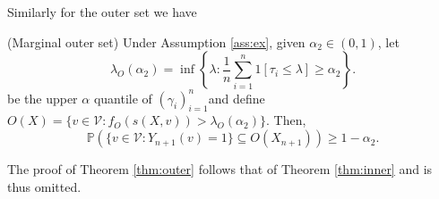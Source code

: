 \noindent Similarly for the outer set we have
\begin{theorem}\label{thm:outer}
	(Marginal outer set)
	Under Assumption \ref{ass:ex}, given $\alpha_2 \in (0,1)$, let 
	\begin{equation*}
		\lambda_O({\alpha_2})= \inf\left\lbrace \lambda: \frac{1}{n} \sum_{i = 1}^n 1\left[ \tau_i\leq \lambda \right] \geq \alpha_2 \right\rbrace.
	\end{equation*}
	be the upper $\alpha$ quantile of $(\gamma_i)_{i = 1}^n$and define $O(X) = \lbrace v \in \mathcal{V}: f_O(s(X,v)) >\lambda_O(\alpha_2)  \rbrace $. Then,
	\begin{equation}\label{eq:probstat}
		\mathbb{P}\left( \lbrace v\in \mathcal{V}: Y_{n+1}(v) = 1 \rbrace \subseteq O(X_{n+1}) \right) \geq 1 - \alpha_2.
	\end{equation}
\end{theorem}
\noindent The proof of Theorem \ref{thm:outer} follows that of Theorem \ref{thm:inner} and is thus omitted. 



%
%

